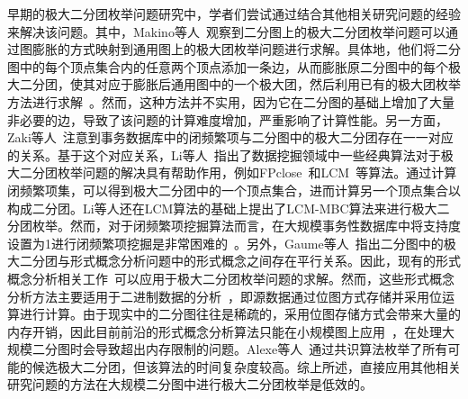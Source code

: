 早期的极大二分团枚举问题研究中，学者们尝试通过结合其他相关研究问题的经验来解决该问题。其中，Makino等人~\cite{Makino04}观察到二分图上的极大二分团枚举问题可以通过图膨胀的方式映射到通用图上的极大团枚举问题进行求解。具体地，他们将二分图中的每个顶点集合内的任意两个顶点添加一条边，从而膨胀原二分图中的每个极大二分团，使其对应于膨胀后通用图中的一个极大团，然后利用已有的极大团枚举方法进行求解~\cite{MCEparallel20,MCE20,MCE22}。然而，这种方法并不实用，因为它在二分图的基础上增加了大量非必要的边，导致了该问题的计算难度增加，严重影响了计算性能。另一方面，Zaki等人~\cite{CFI98}注意到事务数据库中的闭频繁项与二分图中的极大二分团存在一一对应的关系。基于这个对应关系，Li等人~\cite{correspondence05}指出了数据挖掘领域中一些经典算法对于极大二分团枚举问题的解决具有帮助作用，例如FPclose~\cite{fpclose04}和LCM~\cite{lcm04}等算法。通过计算闭频繁项集，可以得到极大二分团中的一个顶点集合，进而计算另一个顶点集合以构成二分团。Li等人还在LCM算法的基础上提出了LCM-MBC算法来进行极大二分团枚举。然而，对于闭频繁项挖掘算法而言，在大规模事务性数据库中将支持度设置为1进行闭频繁项挖掘是非常困难的~\cite{iMBEA14}。另外，Gaume等人~\cite{fcambe10}指出二分图中的极大二分团与形式概念分析问题中的形式概念之间存在平行关系。因此，现有的形式概念分析相关工作~\cite{FCA15,FCA21,FCA22}可以应用于极大二分团枚举问题的求解。然而，这些形式概念分析方法主要适用于二进制数据的分析~\cite{FCA15}，即源数据通过位图方式存储并采用位运算进行计算。由于现实中的二分图往往是稀疏的，采用位图存储方式会带来大量的内存开销，因此目前前沿的形式概念分析算法只能在小规模图上应用~\cite{FCA21,FCA22}，在处理大规模二分图时会导致超出内存限制的问题。Alexe等人~\cite{MICA04}通过共识算法枚举了所有可能的候选极大二分团，但该算法的时间复杂度较高。综上所述，直接应用其他相关研究问题的方法在大规模二分图中进行极大二分团枚举是低效的。

